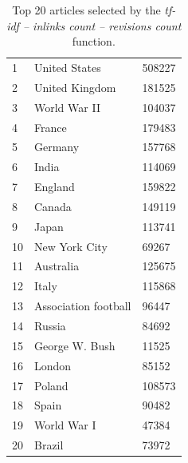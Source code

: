 \begin{table}
    \centering
    \begin{tabular}{lll}
    1  & United States        & 508227 \\
    2  & United Kingdom       & 181525 \\
    3  & World War II         & 104037 \\
    4  & France               & 179483 \\
    5  & Germany              & 157768 \\
    6  & India                & 114069 \\
    7  & England              & 159822 \\
    8  & Canada               & 149119 \\
    9  & Japan                & 113741 \\
    10 & New York City        & 69267  \\
    11 & Australia            & 125675 \\
    12 & Italy                & 115868 \\
    13 & Association football & 96447  \\
    14 & Russia               & 84692  \\
    15 & George W. Bush       & 11525  \\
    16 & London               & 85152  \\
    17 & Poland               & 108573 \\
    18 & Spain                & 90482  \\
    19 & World War I          & 47384  \\
    20 & Brazil               & 73972  \\
    \end{tabular}
    \caption {Top 20 articles selected by the \emph{tf-idf -- inlinks count --
revisions count} function.}
  \label{tab:inl-rc}
\end{table}

